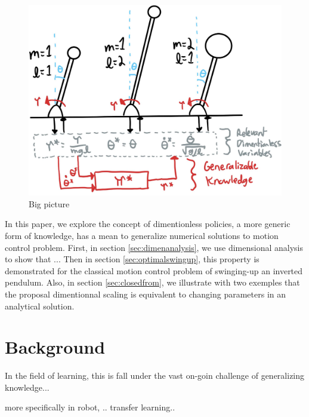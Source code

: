 \begin{figure}[t]
\vspace{-5pt}
\begin{center}
\includegraphics[width=0.99\linewidth]{fig/bigpicture2.jpg}
\caption{Big picture}\label{fig:big_picture}
\end{center}
\vspace{-25pt}
\end{figure}

In this paper, we explore the concept of dimentionless policies, a more generic form of knowledge, has a mean to generalize numerical solutions to motion control problem. First, in section \ref{sec:dimenanalysis}, we use dimensional analysis to show that ... Then in section \ref{sec:optimalswingup}, this property is demonstrated for the classical motion control problem of swinging-up an inverted pendulum. Also, in section \ref{sec:closedfrom}, we illustrate with two exemples that the proposal dimentionnal scaling is equivalent to changing parameters in an analytical solution. 


\section{Background}

In the field of learning, this is fall under the vast on-goin challenge of generalizing knowledge...

more specifically in robot, .. transfer learning..

